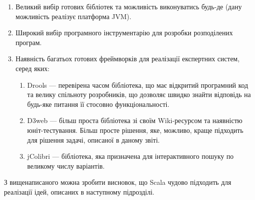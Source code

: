 \begin{enumerate}
    \item 
        Великий вибір готових бібліотек та можливість виконуватись будь-де (дану
        можливість реалізує платформа JVM).
    \item
        Широкий вибір програмного інструментарію для розробки розподілених
        програм.
    \item
        Наявність багатьох готових фреймворків для реалізації експертних систем,
        серед яких:
        \begin{enumerate}
            \item Drools \cite{Drools} --- перевірена часом бібліотека, що має
                відкритий програмний код та велику спільноту розробників,
                що дозволяє швидко знайти відповідь на будь-яке питання її
                стосовно функціональності.
            \item
                D3web \cite{D3web} --- більш проста бібліотека зі своїм
                Wiki-ресурсом та наявністю юніт-тестування.
                Більш просте рішення, яке, можливо, краще підходить для рішення
                задачі, описаної в даному звіті.
            \item
                jColibri \cite{jColibri} --- бібліотека, яка призначена для
                інтерактивного пошуку по великому числу варіантів.
        \end{enumerate}
\end{enumerate}

З вищенаписаного можна зробити висновок, що Scala чудово підходить для
реалізації ідей, описаних в наступному підрозділі.
